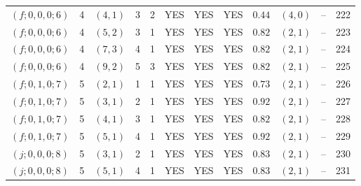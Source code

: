 \begin{longtable}{|c|c|c|c|c|c|c|c|c|c|c|c|}
$(f;0,0,0;6)$ & 4 & $(4,1)$ & 3 & 2 & YES & YES & YES & $0.44$ & $(4,0)$ & -- & 222\\
$(f;0,0,0;6)$ & 4 & $(5,2)$ & 3 & 1 & YES & YES & YES & $0.82$ & $(2,1)$ & -- & 223\\
$(f;0,0,0;6)$ & 4 & $(7,3)$ & 4 & 1 & YES & YES & YES & $0.82$ & $(2,1)$ & -- & 224\\
$(f;0,0,0;6)$ & 4 & $(9,2)$ & 5 & 3 & YES & YES & YES & $0.82$ & $(2,1)$ & -- & 225\\
$(f;0,1,0;7)$ & 5 & $(2,1)$ & 1 & 1 & YES & YES & YES & $0.73$ & $(2,1)$ & -- & 226\\
$(f;0,1,0;7)$ & 5 & $(3,1)$ & 2 & 1 & YES & YES & YES & $0.92$ & $(2,1)$ & -- & 227\\
$(f;0,1,0;7)$ & 5 & $(4,1)$ & 3 & 1 & YES & YES & YES & $0.82$ & $(2,1)$ & -- & 228\\
$(f;0,1,0;7)$ & 5 & $(5,1)$ & 4 & 1 & YES & YES & YES & $0.92$ & $(2,1)$ & -- & 229\\
$(j;0,0,0;8)$ & 5 & $(3,1)$ & 2 & 1 & YES & YES & YES & $0.83$ & $(2,1)$ & -- & 230\\
$(j;0,0,0;8)$ & 5 & $(5,1)$ & 4 & 1 & YES & YES & YES & $0.83$ & $(2,1)$ & -- & 231
\end{longtable}
